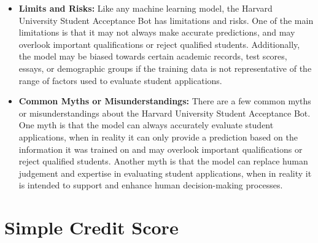 \begin{itemize}
\begin{enumerate}
        \end{enumerate}
    \item \textbf{Limits and Risks:} Like any machine learning model, the Harvard University Student Acceptance Bot has limitations and risks. One of the main limitations is that it may not always make accurate predictions, and may overlook important qualifications or reject qualified students. Additionally, the model may be biased towards certain academic records, test scores, essays, or demographic groups if the training data is not representative of the range of factors used to evaluate student applications.
    \item \textbf{Common Myths or Misunderstandings:} There are a few common myths or misunderstandings about the Harvard University Student Acceptance Bot. One myth is that the model can always accurately evaluate student applications, when in reality it can only provide a prediction based on the information it was trained on and may overlook important qualifications or reject qualified students. Another myth is that the model can replace human judgement and expertise in evaluating student applications, when in reality it is intended to support and enhance human decision-making processes.
\end{itemize}

\section{Simple Credit Score}

